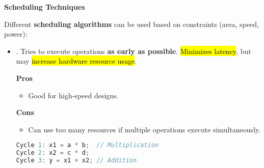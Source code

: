 \highspace
\begin{flushleft}
    \textcolor{Green3}{\faIcon{\speedIcon} \textbf{Scheduling Techniques}}
\end{flushleft}
Different \textbf{scheduling algorithms} can be used based on constraints (area, speed, power):
\begin{itemize}
    \item {}. Tries to execute operations \textbf{as early as possible}. \hl{Minimizes latency}, but may \hl{increase hardware resource usage}.
    \begin{flushleft}
        \textcolor{Green3}{ \textbf{Pros}}
    \end{flushleft}
    \begin{itemize}[label=\textcolor{Green3}{}]
        \item Good for high-speed designs.
    \end{itemize}
    \begin{flushleft}
        \textcolor{Red2}{ \textbf{Cons}}
    \end{flushleft}
    \begin{itemize}[label=\textcolor{Red2}{}]
        \item Can use too many resources if multiple operations execute simultaneously.
    \end{itemize}
    \begin{examplebox}
        \begin{lstlisting}[language=c++]
Cycle 1: x1 = a * b;  // Multiplication
Cycle 2: x2 = c * d;
Cycle 3: y = x1 + x2; // Addition\end{lstlisting}
    \end{examplebox}



\end{itemize}
